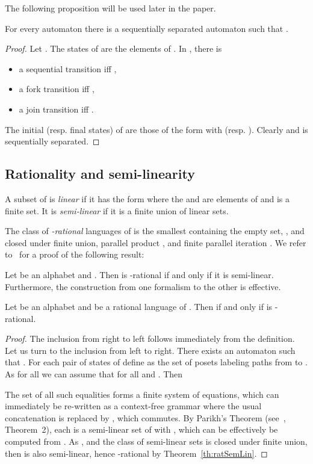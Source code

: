 \documentclass{CSML}
\begin{document}
The following proposition will be used later in the paper.
\begin{prop}
  \label{prop:seqSepAuto}
  For every automaton  there is a sequentially separated automaton  such that .
\end{prop}

\begin{proof}
  Let .
  The states of  are the elements of .
  In , there is 
  \begin{itemize}
    \item a sequential transition  iff ,
    \item a fork transition  iff ,
    \item a join transition  iff .
  \end{itemize}
  The initial (resp. final states) of  are those of the form  with  (resp. ).
  Clearly  and  is sequentially separated.
\end{proof}

\subsection{Rationality and semi-linearity}
\label{subsec:ratSemiLin}

A subset  of  is \emph{linear} if it has the form  where the  and  are elements of  and  is a finite set. It is \emph{semi-linear} if it is a finite union of linear sets.

The class of \emph{-rational} languages of  is the smallest containing the empty set, , and closed under finite union, parallel product , and finite parallel iteration . 
We refer to~\cite{EilSch69} for a proof of the following result:
\begin{thm}
  \label{th:ratSemLin}
  Let  be an alphabet and . Then  is -rational if and only if it is semi-linear. Furthermore, the construction from one formalism to the other is effective.
\end{thm}

\begin{prop}
  \label{prop:parallelRational}
  Let  be an alphabet and  be a rational language of .
  Then  if and only if  is -rational.
\end{prop}

\begin{proof}
  The inclusion from right to left follows immediately from the definition.
  Let us turn to the inclusion from left to right. There exists an automaton  such that . For each pair  of states of  define  as the set of posets labeling paths from  to . As  for all  we can assume that  for all  and . Then 

The set of all such equalities forms a finite system of equations, which can immediately be re-written as a context-free grammar  where the usual concatenation is replaced by , which commutes. By Parikh's Theorem (see~\cite{Parikh:1966:CL:321356.321364}, Theorem~2), each  is a semi-linear set of  with , which can be effectively be computed from . As , and the class of semi-linear sets is closed under finite union, then  is also semi-linear, hence -rational by Theorem~\ref{th:ratSemLin}. 
\end{proof}
\end{document}

